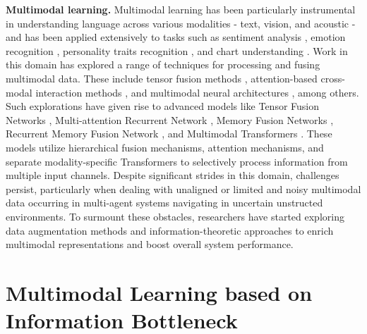 \documentclass{article} %
\begin{document}
\textbf{Multimodal learning.} Multimodal learning has been particularly instrumental in understanding language across various modalities - text, vision, and acoustic - and has been applied extensively to tasks such as sentiment analysis \citep{poria2018multimodal}, emotion recognition \citep{zadeh2018multimodal}, personality traits recognition \citep{park2014computational}, and chart understanding \citep{zhou2023enhanced}. Work in this domain has explored a range of techniques for processing and fusing multimodal data. These include tensor fusion methods \citep{liu2018efficient, zadeh2017tensor, zadeh2016mosi}, attention-based cross-modal interaction methods \citep{lv2021progressive, tsai2019multimodal}, and multimodal neural architectures \citep{pham2019found, hazarika2018conversational}, among others. Such explorations have given rise to advanced models like Tensor Fusion Networks \citep{zadeh2018memory}, Multi-attention Recurrent Network \citep{zadeh2018multi}, Memory Fusion Networks \citep{zadeh2018memory}, Recurrent Memory Fusion Network \citep{liang2018multimodal}, and Multimodal Transformers \citep{tsai2019multimodal}. These models utilize hierarchical fusion mechanisms, attention mechanisms, and separate modality-specific Transformers to selectively process information from multiple input channels. Despite significant strides in this domain, challenges persist, particularly when dealing with unaligned or limited and noisy multimodal data occurring in multi-agent systems navigating in uncertain unstructed environments. To surmount these obstacles, researchers have started exploring data augmentation methods and information-theoretic approaches to enrich multimodal representations and boost overall system performance.


\section{Multimodal Learning based on Information Bottleneck}
\label{sec:probForm}


\end{document}
